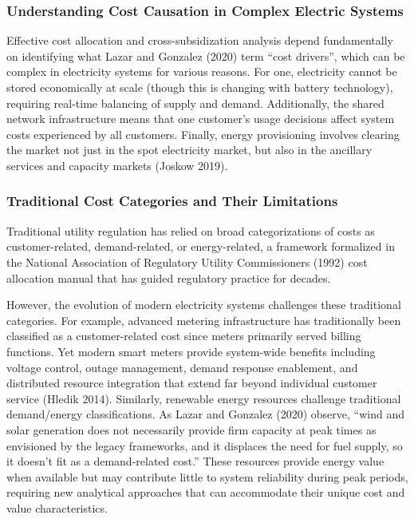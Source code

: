 \documentclass[
  11pt,
]{article}
\begin{document}
\subsubsection{Understanding Cost Causation in Complex Electric
Systems}\label{understanding-cost-causation-in-complex-electric-systems}

Effective cost allocation and cross-subsidization analysis depend
fundamentally on identifying what Lazar and Gonzalez (2020) term ``cost
drivers'', which can be complex in electricity systems for various
reasons. For one, electricity cannot be stored economically at scale
(though this is changing with battery technology), requiring real-time
balancing of supply and demand. Additionally, the shared network
infrastructure means that one customer's usage decisions affect system
costs experienced by all customers. Finally, energy provisioning
involves clearing the market not just in the spot electricity market,
but also in the ancillary services and capacity markets (Joskow 2019).

\subsubsection{Traditional Cost Categories and Their
Limitations}\label{traditional-cost-categories-and-their-limitations}

Traditional utility regulation has relied on broad categorizations of
costs as customer-related, demand-related, or energy-related, a
framework formalized in the National Association of Regulatory Utility
Commissioners (1992) cost allocation manual that has guided regulatory
practice for decades.

However, the evolution of modern electricity systems challenges these
traditional categories. For example, advanced metering infrastructure
has traditionally been classified as a customer-related cost since
meters primarily served billing functions. Yet modern smart meters
provide system-wide benefits including voltage control, outage
management, demand response enablement, and distributed resource
integration that extend far beyond individual customer service (Hledik
2014). Similarly, renewable energy resources challenge traditional
demand/energy classifications. As Lazar and Gonzalez (2020) observe,
``wind and solar generation does not necessarily provide firm capacity
at peak times as envisioned by the legacy frameworks, and it displaces
the need for fuel supply, so it doesn't fit as a demand-related cost.''
These resources provide energy value when available but may contribute
little to system reliability during peak periods, requiring new
analytical approaches that can accommodate their unique cost and value
characteristics.
\end{document}
